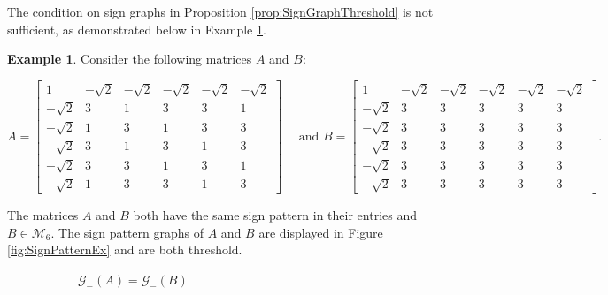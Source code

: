 \documentclass{amsart}
\newcommand{\cG}{\mathcal{G}}
\theoremstyle{definition}
\newtheorem{example}[theorem]{Example}
\begin{document}
The condition on sign graphs in Proposition \ref{prop:SignGraphThreshold} is not sufficient, as demonstrated below in Example \ref{ex:SignPatternsSame}.

\begin{example}\label{ex:SignPatternsSame}
 Consider the following matrices $A$ and $B$:

\[A = \begin{bmatrix} 1 & -\sqrt{2} & -\sqrt{2} & -\sqrt{2} & -\sqrt{2} & -\sqrt{2}\\ -\sqrt{2} & 3 & 1 & 3 & 3 & 1\\
-\sqrt{2} & 1 & 3 & 1 & 3 & 3\\
-\sqrt{2} & 3 & 1 & 3 & 1 & 3\\
-\sqrt{2} & 3 & 3 & 1 & 3 & 1\\
-\sqrt{2} & 1 & 3 & 3 & 1& 3\end{bmatrix} \quad \text{ and } B = \begin{bmatrix} 1 & -\sqrt{2} & -\sqrt{2} & -\sqrt{2}& -\sqrt{2} & -\sqrt{2}\\ -\sqrt{2} & 3 & 3 & 3 & 3 & 3\\
-\sqrt{2} & 3 & 3 & 3 & 3 & 3\\
-\sqrt{2} & 3 & 3 & 3 & 3 & 3\\
-\sqrt{2} & 3 & 3 & 3 & 3 & 3\\
-\sqrt{2} & 3 & 3 & 3 & 3 & 3\end{bmatrix}.\]

The matrices $A$ and $B$ both have the same sign pattern in their entries and $B \in \mathcal{M}_6$. The sign pattern graphs of $A$ and $B$ are displayed in Figure \ref{fig:SignPatternEx} and are both threshold.

\begin{figure}
\begin{subfigure}[b]{0.45\textwidth}
\centering
{}
\caption{$\cG_{-}(A) = \cG_{-}(B)$}
\end{subfigure}
\begin{subfigure}[b]{0.45\textwidth}
\centering
\end{subfigure}
\end{figure}
\end{example}
\end{document}
